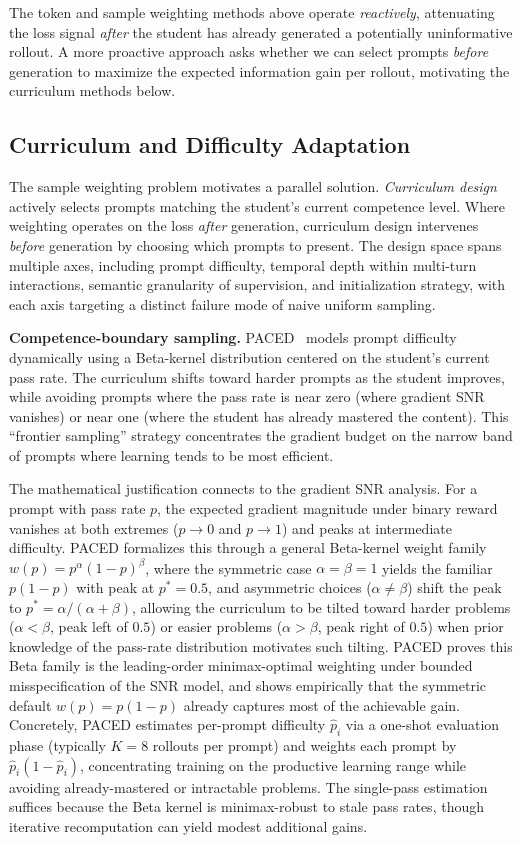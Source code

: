 \documentclass{article} %
\begin{document}
The token and sample weighting methods above operate \emph{reactively}, attenuating the loss signal \emph{after} the student has already generated a potentially uninformative rollout. A more proactive approach asks whether we can select prompts \emph{before} generation to maximize the expected information gain per rollout, motivating the curriculum methods below.

\subsection{Curriculum and Difficulty Adaptation}
\label{subsec:curriculum}

The sample weighting problem motivates a parallel solution. \emph{Curriculum design} actively selects prompts matching the student's current competence level. Where weighting operates on the loss \emph{after} generation, curriculum design intervenes \emph{before} generation by choosing which prompts to present. The design space spans multiple axes, including prompt difficulty, temporal depth within multi-turn interactions, semantic granularity of supervision, and initialization strategy, with each axis targeting a distinct failure mode of naive uniform sampling.

\textbf{Competence-boundary sampling.} PACED~\citep{2603.11178} models prompt difficulty dynamically using a Beta-kernel distribution centered on the student's current pass rate. The curriculum shifts toward harder prompts as the student improves, while avoiding prompts where the pass rate is near zero (where gradient SNR vanishes) or near one (where the student has already mastered the content). This ``frontier sampling'' strategy concentrates the gradient budget on the narrow band of prompts where learning tends to be most efficient.

The mathematical justification connects to the gradient SNR analysis. For a prompt with pass rate $p$, the expected gradient magnitude under binary reward vanishes at both extremes ($p \to 0$ and $p \to 1$) and peaks at intermediate difficulty. PACED formalizes this through a general Beta-kernel weight family $w(p) = p^\alpha(1-p)^\beta$, where the symmetric case $\alpha = \beta = 1$ yields the familiar $p(1-p)$ with peak at $p^* = 0.5$, and asymmetric choices ($\alpha \neq \beta$) shift the peak to $p^* = \alpha/(\alpha + \beta)$, allowing the curriculum to be tilted toward harder problems ($\alpha < \beta$, peak left of $0.5$) or easier problems ($\alpha > \beta$, peak right of $0.5$) when prior knowledge of the pass-rate distribution motivates such tilting. PACED proves this Beta family is the leading-order minimax-optimal weighting under bounded misspecification of the SNR model, and shows empirically that the symmetric default $w(p) = p(1-p)$ already captures most of the achievable gain. Concretely, PACED estimates per-prompt difficulty $\hat{p}_i$ via a one-shot evaluation phase (typically $K{=}8$ rollouts per prompt) and weights each prompt by $\hat{p}_i (1 - \hat{p}_i)$, concentrating training on the productive learning range while avoiding already-mastered or intractable problems. The single-pass estimation suffices because the Beta kernel is minimax-robust to stale pass rates, though iterative recomputation can yield modest additional gains.
\end{document}
